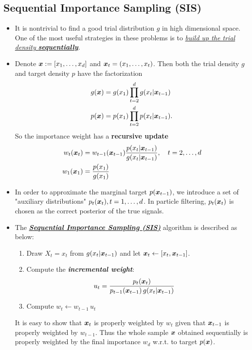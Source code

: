 \documentclass[11pt]{article}
\begin{document}
\subsection{Sequential Importance Sampling (SIS)}
\begin{itemize}
\item It is nontrivial to find a good trial distribution $g$ in high dimensional space. One of the most useful strategies in these problems is to \underline{\emph{build up the trial density} \emph{\textbf{sequentially}}}. 

\item Denote $\boldsymbol{x} := [x_1, \ldots, x_{d}]$ and $\boldsymbol{x}_{t} = (x_1, \ldots, x_t)$. Then both the trial density $g$ and target density $p$ have the factorization
\begin{align*}
g(\boldsymbol{x}) &= g(x_1)\prod_{t=2}^{d}g(x_{t}| \boldsymbol{x}_{t-1})\\
p(\boldsymbol{x}) &= p(x_1)\prod_{t=2}^{d}p(x_{t}| \boldsymbol{x}_{t-1}). 
\end{align*} So the importance weight has a \textbf{recursive update}
\begin{align}
w_{t}(\boldsymbol{x}_{t}) &=w_{t-1}(\boldsymbol{x}_{t-1})\frac{p(x_{t}| \boldsymbol{x}_{t-1})}{g(x_{t}| \boldsymbol{x}_{t-1})}, \quad t=2,\ldots, d  \label{eqn: sis_weight_update}\\
w_{1}(\boldsymbol{x}_{1}) &= \frac{p(x_1)}{g(x_1)} \nonumber
\end{align}

\item In order to approximate the marginal target $p(\boldsymbol{x}_{t-1})$, we introduce a set of "auxiliary distributions" $p_t(\boldsymbol{x}_{t}), t=1,\ldots, d$. In particle filtering, $p_t(\boldsymbol{x}_{t})$ is chosen as the correct posterior of the true signals.

\item The \underline{\emph{\textbf{Sequential Importance Sampling (SIS)}}} algorithm is described as below:
\begin{enumerate}
\item Draw $X_t = x_t$ from $g(x_t|\boldsymbol{x}_{t-1})$ and let $\boldsymbol{x}_t \leftarrow [x_t, \boldsymbol{x}_{t-1}]$.
\item Compute the \emph{\textbf{incremental weight}}:
\begin{align}
u_{t} &= \frac{p_t(\boldsymbol{x}_{t})}{p_{t-1}(\boldsymbol{x}_{t-1}) \, g(x_t|\boldsymbol{x}_{t-1})}
\end{align}
\item Compute $w_{t} \leftarrow w_{t-1}\,u_{t}$
\end{enumerate}
It is easy to show that $\boldsymbol{x}_t$ is properly weighted by $w_t$ given that $\boldsymbol{x}_{t-1}$ is properly weighted by $w_{t-1}$. Thus the whole sample $\boldsymbol{x}$ obtained sequentially is properly weighted by the  final importance $w_{d}$ w.r.t. to target $p(\boldsymbol{x})$.


\end{itemize}
\end{document}
